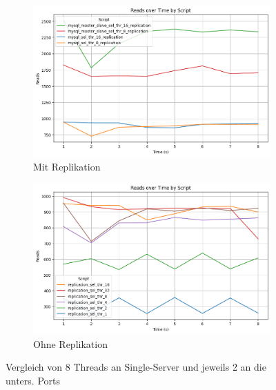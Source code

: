 \vspace{-8pt}
\begin{figure}[H]
  \centering
  \begin{subfigure}[t]{0.48\textwidth}
    \includegraphics[width=\textwidth]{PNGs/Script/Replication/replication-multiple-select-threads/Reads}
    \caption{Mit Replikation}
    \label{replication-multiple-select-threads-reads}
  \end{subfigure}
  \hfill
  \begin{subfigure}[t]{0.48\textwidth}
    \includegraphics[width=\textwidth]{PNGs/Script/Replication/replication-no-multiple-select-threads/Reads}
    \caption{Ohne Replikation}
    \label{replication-no-multiple-select-threads-reads}
  \end{subfigure}
  \vspace{-5pt}
  \caption[Replikation: Threadanzahl aufgeteilt an Master-Replica]{Vergleich von 8 Threads an Single-Server und jeweils 2 an die unters. Ports }
  \label{fig:replication-multiple-select-threads}
\end{figure}
\vspace{-20pt}

